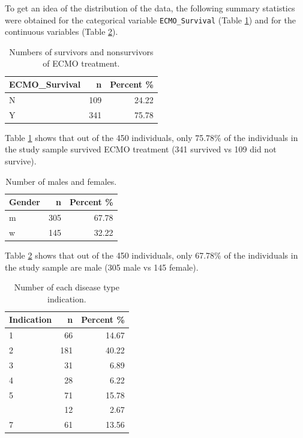 \documentclass[12pt,]{article}
\begin{document}
To get an idea of the distribution of the data, the following summary
statistics were obtained for the categorical variable
\texttt{ECMO\_Survival} (Table \ref{tab:ECMO_Survival-table}) and for
the continuous variables (Table \ref{tab:gender-table}).

\begin{table}[!h]

\caption{\label{tab:unnamed-chunk-1}\label{tab:ECMO_Survival-table} Numbers of survivors and nonsurvivors of ECMO treatment.}
\centering
\fontsize{10}{12}\selectfont
\begin{tabular}{lrr}
\toprule
ECMO\_Survival & n & Percent \%\\
\midrule
N & 109 & 24.22\\
Y & 341 & 75.78\\
\bottomrule
\end{tabular}
\end{table}

Table \ref{tab:ECMO_Survival-table} shows that out of the 450
individuals, only 75.78\% of the individuals in the study sample
survived ECMO treatment (341 survived vs 109 did not survive).

\begin{table}[!h]

\caption{\label{tab:unnamed-chunk-2}\label{tab:gender-table} Number of males and females.}
\centering
\fontsize{10}{12}\selectfont
\begin{tabular}{lrr}
\toprule
Gender & n & Percent \%\\
\midrule
m & 305 & 67.78\\
w & 145 & 32.22\\
\bottomrule
\end{tabular}
\end{table}

Table \ref{tab:gender-table} shows that out of the 450 individuals, only
67.78\% of the individuals in the study sample are male (305 male vs 145
female).

\begin{table}[!h]

\caption{\label{tab:unnamed-chunk-3}\label{tab:indications-table} Number of each disease type indication.}
\centering
\fontsize{10}{12}\selectfont
\begin{tabular}{lrr}
\toprule
Indication & n & Percent \%\\
\midrule
1 & 66 & 14.67\\
2 & 181 & 40.22\\
3 & 31 & 6.89\\
4 & 28 & 6.22\\
5 & 71 & 15.78\\
\addlinespace
6 & 12 & 2.67\\
7 & 61 & 13.56\\
\bottomrule
\end{tabular}
\end{table}
\end{document}

